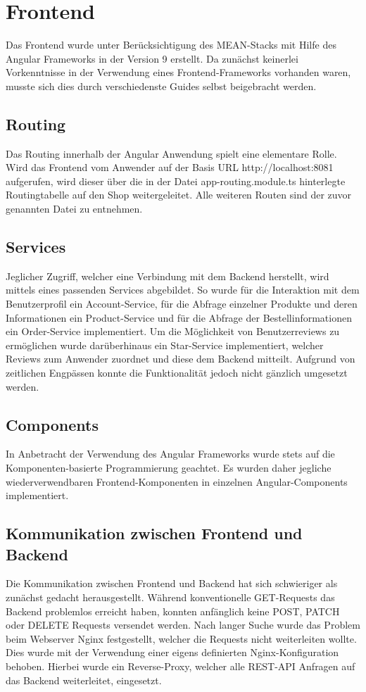 \chapter{Frontend}\label{ch:frontend}
Das Frontend wurde unter Berücksichtigung des MEAN-Stacks mit Hilfe des Angular Frameworks in der Version 9 erstellt. Da zunächst keinerlei Vorkenntnisse in der Verwendung eines Frontend-Frameworks vorhanden waren, musste sich dies durch verschiedenste Guides selbst beigebracht werden.
\section{Routing}
Das Routing innerhalb der Angular Anwendung spielt eine elementare Rolle. Wird das Frontend vom Anwender auf der Basis URL http://localhost:8081 aufgerufen, wird dieser über die in der Datei app-routing.module.ts hinterlegte Routingtabelle auf den Shop weitergeleitet. Alle weiteren Routen sind der zuvor genannten Datei zu entnehmen.

\section{Services}
Jeglicher Zugriff, welcher eine Verbindung mit dem Backend herstellt, wird mittels eines passenden Services abgebildet. So wurde für die Interaktion mit dem Benutzerprofil ein Account-Service, für die Abfrage einzelner Produkte und deren Informationen ein Product-Service und für die Abfrage der Bestellinformationen ein Order-Service implementiert. Um die Möglichkeit von Benutzerreviews zu ermöglichen wurde darüberhinaus ein Star-Service implementiert, welcher Reviews zum Anwender zuordnet und diese dem Backend mitteilt. Aufgrund von zeitlichen Engpässen konnte die Funktionalität jedoch nicht gänzlich umgesetzt werden.

\section{Components}
In Anbetracht der Verwendung des Angular Frameworks wurde stets auf die Komponenten-basierte Programmierung geachtet. Es wurden daher jegliche wiederverwendbaren Frontend-Komponenten in einzelnen Angular-Components implementiert.

\section{Kommunikation zwischen Frontend und Backend}
Die Kommunikation zwischen Frontend und Backend hat sich schwieriger als zunächst gedacht herausgestellt. Während konventionelle GET-Requests das Backend problemlos erreicht haben, konnten anfänglich keine POST, PATCH oder DELETE Requests versendet werden. Nach langer Suche wurde das Problem beim Webserver Nginx festgestellt, welcher die Requests nicht weiterleiten wollte. Dies wurde mit der Verwendung einer eigens definierten Nginx-Konfiguration behoben. Hierbei wurde ein Reverse-Proxy, welcher alle REST-API Anfragen auf das Backend weiterleitet, eingesetzt.

